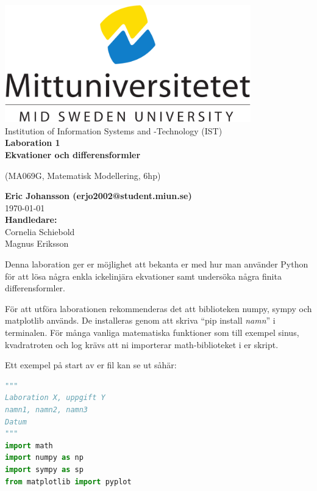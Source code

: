 \documentclass[a4paper]{article}
\makeatletter
\newcommand{\getauthor}{Eric Johansson (erjo2002@student.miun.se)} %
\newcommand{\gettitle}{Laboration 1 \\ Ekvationer och differensformler} %
\newcommand{\getcourse}{(MA069G, Matematisk Modellering, 6hp)} %
\newcommand{\getsupervisor}{Cornelia Schiebold \\Magnus Eriksson}
\makeatother
\begin{document}
\begin{titlepage}
    \begin{center}
        \vspace*{1cm}
        \includegraphics[width=0.8\textwidth]{msu.png}\\[0.5cm]
        \Large
        Institution of Information Systems and -Technology (IST)\\[1cm]
        \Huge
        \textbf{\gettitle}

        \large
        \getcourse{}

        \vspace{1cm}

        \Large
        \textbf{\getauthor}\\
        \vfill
        \vspace{0.8cm}
        \small
        \today \\
        \Large
        \textbf{Handledare:}\\
        \getsupervisor{}
    \end{center}
\end{titlepage}

\tableofcontents
\newpage
    
Denna laboration ger er möjlighet att bekanta er med hur man använder 
Python för att lösa några enkla ickelinjära ekvationer samt undersöka 
några finita differensformler.

För att utföra laborationen rekommenderas det att biblioteken numpy,
sympy och matplotlib används. De installeras genom att skriva ``pip install \textit{namn}'' i terminalen.
För många vanliga matematiska funktioner som till exempel sinus, kvadratroten och log krävs att ni importerar
math-biblioteket i er skript.

Ett exempel på start av er fil kan se ut såhär:
\begin{lstlisting}[language=Python]
"""
Laboration X, uppgift Y 
namn1, namn2, namn3
Datum
"""
import math 
import numpy as np
import sympy as sp 
from matplotlib import pyplot
\end{lstlisting}
\end{document}
